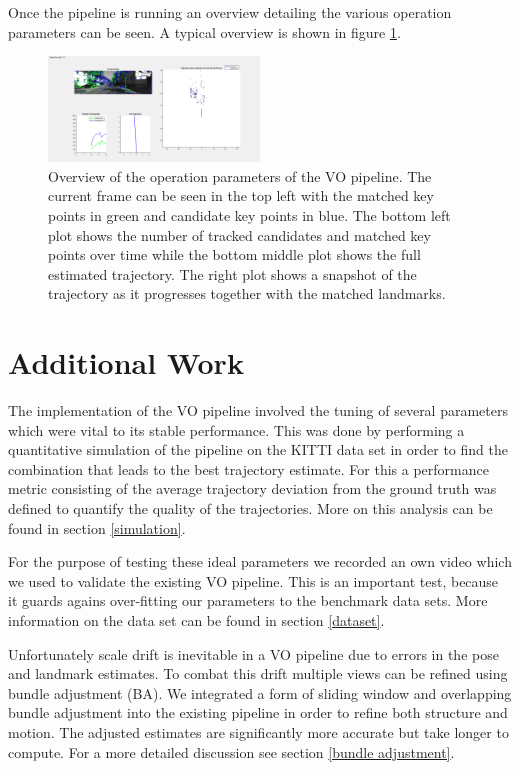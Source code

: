 Once the pipeline is running an overview detailing the various operation parameters can be seen. 
A typical overview is shown in figure \ref{fig:overview}. 

\begin{figure}[H]
  \centering
    \includegraphics[width=0.5\textwidth]{figures/overview}
  \caption{Overview of the operation parameters of the VO pipeline. 
  The current frame can be seen in the top left with the matched key points in green and candidate key points in blue. 
  The bottom left plot shows the number of tracked candidates and matched key points over time while the bottom middle plot shows the full estimated trajectory. 
  The right plot shows a snapshot of the trajectory as it progresses together with the matched landmarks.}
  \label{fig:overview}
\end{figure}

\section{Additional Work}
\label{additionalWork}
The implementation of the VO pipeline involved the tuning of several parameters which were vital to its stable performance. 
This was done by performing a quantitative simulation of the pipeline on the KITTI data set in order to find the combination that leads to the best trajectory estimate. 
For this a performance metric consisting of the average trajectory deviation from the ground truth was defined to quantify the quality of the trajectories. 
More on this analysis can be found in section \ref{simulation}. \par
For the purpose of testing these ideal parameters we recorded an own video which we used to validate the existing VO pipeline. 
This is an important test, because it guards agains over-fitting our parameters to the benchmark data sets. 
More information on the data set can be found in section \ref{dataset}. \par
Unfortunately scale drift is inevitable in a VO pipeline due to errors in the pose and landmark estimates. 
To combat this drift multiple views can be refined using bundle adjustment (BA). 
We integrated a form of sliding window and overlapping bundle adjustment into the existing pipeline in order to refine both structure and motion. 
The adjusted estimates are significantly more accurate but take longer to compute. 
For a more detailed discussion see section \ref{bundle adjustment}.